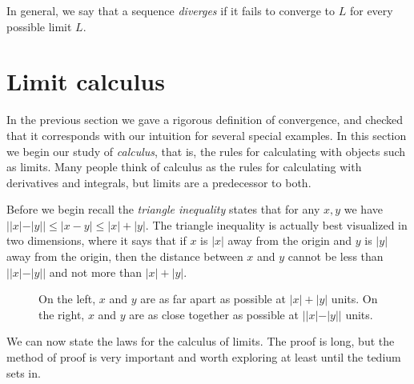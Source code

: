 \documentclass[11pt,oneside]{amsbook}
\theoremstyle{definition}
\theoremstyle{plain}
\theoremstyle{definition}
\theoremstyle{remark}
\numberwithin{equation}{section}
\numberwithin{figure}{section}
\begin{document}
In general, we say that a sequence \emph{diverges} if it fails to converge to $L$ for every possible limit $L$.

\newpage
\section{Limit calculus}

In the previous section we gave a rigorous definition of convergence, and checked that it corresponds with our intuition for several special examples. In this section we begin our study of \emph{calculus}, that is, the rules for calculating with objects such as limits. Many people think of calculus as the rules for calculating with derivatives and integrals, but limits are a predecessor to both.

Before we begin recall the \emph{triangle inequality} states that for any $x,y$ we have $||x|-|y||\leq|x-y|\leq|x|+|y|$. The triangle inequality is actually best visualized in two dimensions, where it says that if $x$ is $|x|$ away from the origin and $y$ is $|y|$ away from the origin, then the distance between $x$ and $y$ cannot be less than $||x|-|y||$ and not more than $|x|+|y|$.

\begin{figure}[h]
  \centering
  \qquad
  \caption{On the left, $x$ and $y$ are as far apart as possible at $|x|+|y|$ units. On the right, $x$ and $y$ are as close together as possible at $||x|-|y||$ units.}
\end{figure}

We can now state the laws for the calculus of limits. The proof is long, but the method of proof is very important and worth exploring at least until the tedium sets in.
\end{document}

